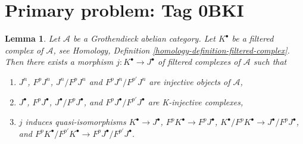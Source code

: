 \documentclass{amsart}
\theoremstyle{plain}
\newtheorem{lemma}[subsection]{Lemma}
\theoremstyle{definition}
\theoremstyle{remark}
\numberwithin{equation}{subsection}
\begin{document}
\section*{Primary problem: Tag 0BKI}
\begin{lemma}
\label{lemma-K-injective-embedding-filtration}
Let $\mathcal{A}$ be a Grothendieck abelian category.
Let $K^\bullet$ be a filtered complex of $\mathcal{A}$, see
Homology, Definition \ref{homology-definition-filtered-complex}.
Then there exists a morphism $j : K^\bullet \to J^\bullet$
of filtered complexes of $\mathcal{A}$ such that
\begin{enumerate}
\item $J^n$, $F^pJ^n$, $J^n/F^pJ^n$ and $F^pJ^n/F^{p'}J^n$ are injective
objects of $\mathcal{A}$,
\item $J^\bullet$, $F^pJ^\bullet$, $J^\bullet/F^pJ^\bullet$, and
$F^pJ^\bullet/F^{p'}J^\bullet$ are K-injective complexes,
\item $j$ induces quasi-isomorphisms
$K^\bullet \to J^\bullet$,
$F^pK^\bullet \to F^pJ^\bullet$,
$K^\bullet/F^pK^\bullet \to J^\bullet/F^pJ^\bullet$, and
$F^pK^\bullet/F^{p'}K^\bullet \to F^pJ^\bullet/F^{p'}J^\bullet$.
\end{enumerate}
\end{lemma}
\end{document}
